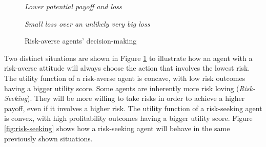 \begin{figure}[H]
    \centering
    \begin{minipage}{.5\textwidth}
      \centering
        
        \textit{Lower potential payoff and loss}
    \end{minipage}%
    \begin{minipage}{.5\textwidth}
      \centering
        
        \textit{Small loss over an unlikely very big loss}
    \end{minipage}
    \caption{Risk-averse agents' decision-making}
    \label{fig:risk-averse}
\end{figure}

Two distinct situations are shown in Figure \ref{fig:risk-averse} to illustrate how an agent with a risk-averse attitude will always choose the action that involves the lowest risk. The utility function of a risk-averse agent is concave, with low risk outcomes having a bigger utility score. Some agents are inherently more risk loving (\textit{Risk-Seeking}). They will be more willing to take risks in order to achieve a higher payoff, even if it involves a higher risk. The utility function of a risk-seeking agent is convex, with high profitability outcomes having a bigger utility score. Figure \ref{fig:risk-seeking} shows how a risk-seeking agent will behave in the same previously shown situations.

